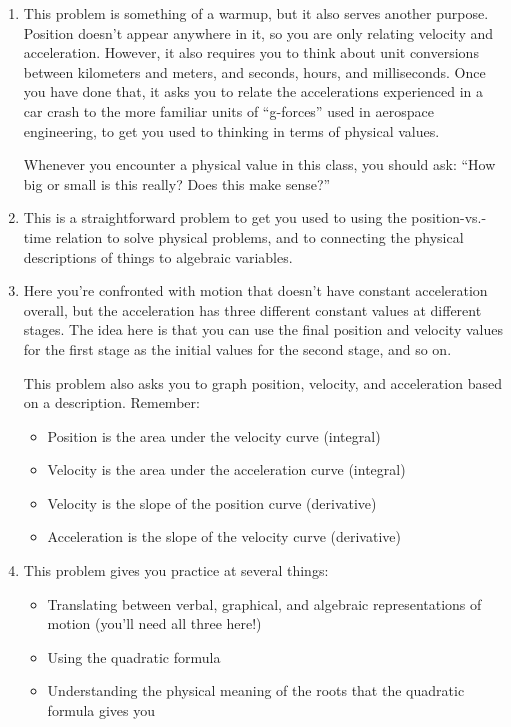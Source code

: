 \documentclass[12pt]{article}
\begin{document}
\Large
\centerline{}
\normalsize

\begin{enumerate}

\item{This problem is something of a warmup, but it also serves another purpose. Position doesn't appear anywhere in it, so you are only
relating velocity and acceleration. However, it also requires you to think about unit conversions between kilometers and meters, and 
seconds, hours, and milliseconds. Once you have done that, it asks you to relate the accelerations experienced in a car crash to the 
more familiar units of ``g-forces'' used in aerospace engineering, to get you used to thinking in terms of physical values. 

Whenever you encounter a physical value in this class, you should ask: ``How big or small is this really? Does this make sense?''}

\item{This is a straightforward problem to get you used to using the position-vs.-time relation to solve physical problems, and to 
connecting the physical descriptions of things to algebraic variables.}


\item{Here you're confronted with motion that doesn't have constant acceleration overall, but the acceleration has three different
constant values at different stages. The idea here is that you can use the final position and velocity values for the first stage as the
initial values for the second stage, and so on.

This problem also asks you to graph position, velocity, and acceleration based on a description. Remember:

\begin{itemize}

\item{Position is the area under the velocity curve (integral)}
\item{Velocity is the area under the acceleration curve (integral)}

\medskip

\item{Velocity is the slope of the position curve (derivative)}
\item{Acceleration is the slope of the velocity curve (derivative)}

\end{itemize}
}

\item{This problem gives you practice at several things:}
\begin{itemize}
\item{Translating between verbal, graphical, and algebraic representations of motion (you'll need all three here!)}
\item{Using the quadratic formula}
\item{Understanding the physical meaning of the roots that the quadratic formula gives you}
\end{itemize}


\end{enumerate}
\end{document}
